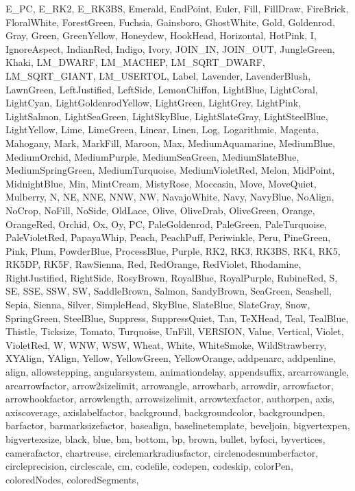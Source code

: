 {{  E_PC, E_RK2, E_RK3BS, Emerald, EndPoint, Euler, Fill, FillDraw, FireBrick,
  FloralWhite, ForestGreen, Fuchsia, Gainsboro, GhostWhite, Gold, Goldenrod,
  Gray, Green, GreenYellow, Honeydew, HookHead, Horizontal, HotPink, I,
  IgnoreAspect, IndianRed, Indigo, Ivory, JOIN_IN, JOIN_OUT, JungleGreen,
  Khaki, LM_DWARF, LM_MACHEP, LM_SQRT_DWARF, LM_SQRT_GIANT, LM_USERTOL,
  Label, Lavender, LavenderBlush, LawnGreen, LeftJustified, LeftSide,
  LemonChiffon, LightBlue, LightCoral, LightCyan, LightGoldenrodYellow,
  LightGreen, LightGrey, LightPink, LightSalmon, LightSeaGreen, LightSkyBlue,
  LightSlateGray, LightSteelBlue, LightYellow, Lime, LimeGreen, Linear,
  Linen, Log, Logarithmic, Magenta, Mahogany, Mark, MarkFill, Maroon, Max,
  MediumAquamarine, MediumBlue, MediumOrchid, MediumPurple, MediumSeaGreen,
  MediumSlateBlue, MediumSpringGreen, MediumTurquoise, MediumVioletRed,
  Melon, MidPoint, MidnightBlue, Min, MintCream, MistyRose, Moccasin, Move,
  MoveQuiet, Mulberry, N, NE, NNE, NNW, NW, NavajoWhite, Navy, NavyBlue,
  NoAlign, NoCrop, NoFill, NoSide, OldLace, Olive, OliveDrab, OliveGreen,
  Orange, OrangeRed, Orchid, Ox, Oy, PC, PaleGoldenrod, PaleGreen,
  PaleTurquoise, PaleVioletRed, PapayaWhip, Peach, PeachPuff, Periwinkle,
  Peru, PineGreen, Pink, Plum, PowderBlue, ProcessBlue, Purple, RK2, RK3,
  RK3BS, RK4, RK5, RK5DP, RK5F, RawSienna, Red, RedOrange, RedViolet,
  Rhodamine, RightJustified, RightSide, RosyBrown, RoyalBlue, RoyalPurple,
  RubineRed, S, SE, SSE, SSW, SW, SaddleBrown, Salmon, SandyBrown, SeaGreen,
  Seashell, Sepia, Sienna, Silver, SimpleHead, SkyBlue, SlateBlue, SlateGray,
  Snow, SpringGreen, SteelBlue, Suppress, SuppressQuiet, Tan, TeXHead, Teal,
  TealBlue, Thistle, Ticksize, Tomato, Turquoise, UnFill, VERSION, Value,
  Vertical, Violet, VioletRed, W, WNW, WSW, Wheat, White, WhiteSmoke,
  WildStrawberry, XYAlign, YAlign, Yellow, YellowGreen, YellowOrange,
  addpenarc, addpenline, align, allowstepping, angularsystem, animationdelay,
  appendsuffix, arcarrowangle, arcarrowfactor, arrow2sizelimit, arrowangle,
  arrowbarb, arrowdir, arrowfactor, arrowhookfactor, arrowlength,
  arrowsizelimit, arrowtexfactor, authorpen, axis, axiscoverage,
  axislabelfactor, background, backgroundcolor, backgroundpen, barfactor,
  barmarksizefactor, basealign, baselinetemplate, beveljoin, bigvertexpen,
  bigvertexsize, black, blue, bm, bottom, bp, brown, bullet, byfoci,
  byvertices, camerafactor, chartreuse, circlemarkradiusfactor,
  circlenodesnumberfactor, circleprecision, circlescale, cm, codefile,
  codepen, codeskip, colorPen, coloredNodes, coloredSegments,
}}
